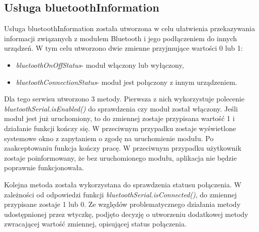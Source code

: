 \subsection{Usługa bluetoothInformation}%
Usługa bluetoothInformation została utworzona w celu ułatwienia przekazywania informacji związanych z modułem Bluetooth i jego podłączeniem do innych urządzeń. W tym celu utworzono dwie zmienne  przyjmujące wartości 0 lub 1:
\begin{itemize}
\item \textit{bluetoothOnOffStatus}- moduł włączony lub wyłączony,
\item \textit{bluetoothConnectionStatus}- moduł jest połączony z innym urządzeniem.
\end{itemize}
Dla tego serwisu utworzono 3 metody. Pierwsza z nich wykorzystuje polecenie \textit{bluetoothSerial.isEnabled()} do sprawdzenia czy moduł został włączony. Jeśli moduł jest już uruchomiony, to do zmiennej zostaje przypisana wartość 1 i działanie funkcji kończy się. W przeciwnym przypadku zostaje wyświetlone systemowe okno z zapytaniem o zgodę na uruchomienie modułu. Po zaakceptowaniu funkcja kończy pracę. W przeciwnym przypadku użytkownik zostaje poinformowany, że bez uruchomionego modułu, aplikacja nie będzie poprawnie funkcjonowała.

Kolejna metoda została wykorzystana do sprawdzenia statusu połączenia. W zależności od odpowiedzi funkcji \textit{bluetoothSerial.isConnected()}, do zmiennej przypisane zostaje 1 lub 0. Ze względów problematycznego działania metody udostępnionej przez wtyczkę, podjęto decyzję o utworzeniu dodatkowej metody zwracającej wartość zmiennej, opisującej status połączenia.


